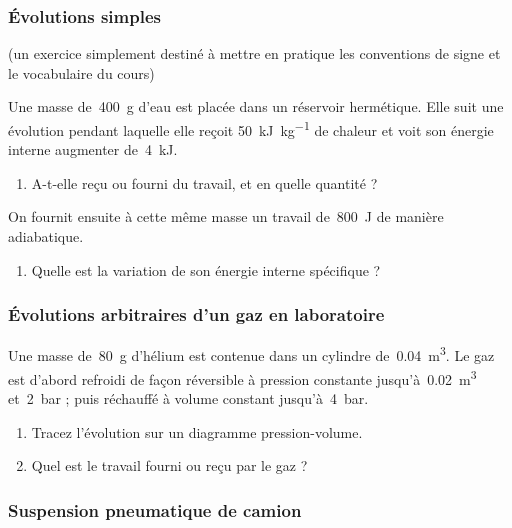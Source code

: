 \subsubsection{Évolutions simples}
\label{exo_evolutions_simples}

	(un exercice simplement destiné à mettre en pratique les conventions de signe et le vocabulaire du cours)

	Une masse de~\SI{400}{\gram} d’eau est placée dans un réservoir hermétique. Elle suit une évolution pendant laquelle elle reçoit \SI{50}{\kilo\joule\per\kilogram} de chaleur et voit son énergie interne augmenter de~\SI{4}{\kilo\joule}.
	
	\begin{enumerate}
		\item A-t-elle reçu ou fourni du travail, et en quelle quantité ?
	\end{enumerate}
	
	On fournit ensuite à cette même masse un travail de~\SI{800}{\joule} de manière adiabatique.
	
	\begin{enumerate}
		\item Quelle est la variation de son énergie interne spécifique ?
	\end{enumerate}
	

\subsubsection{Évolutions arbitraires d’un gaz en laboratoire}
\label{exo_evolutions_arbitraires}

	Une masse de~\SI{80}{\gram} d’hélium est contenue dans un cylindre de~\SI{0,04}{\metre\cubed}. Le gaz est d’abord refroidi de façon réversible à pression constante jusqu’à~\SI{0,02}{\metre\cubed} et~\SI{2}{\bar} ; puis réchauffé à volume constant jusqu’à~\SI{4}{\bar}.
	
	\begin{enumerate}
		\item Tracez l’évolution sur un diagramme pression-volume.
		\item Quel est le travail fourni ou reçu par le gaz ?
	\end{enumerate}


\subsubsection{Suspension pneumatique de camion}
\label{exo_pneumatique_camion}


